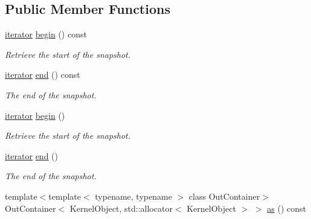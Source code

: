 \subsection*{Public Member Functions}
\begin{DoxyCompactItemize}
\item 
\mbox{\hyperlink{classdistant_1_1kernel__objects_1_1snapshot__iterator}{iterator}} \mbox{\hyperlink{classdistant_1_1kernel__objects_1_1snapshot_a5e9c95fe747a3f4d28dc3d352874770e}{begin}} () const
\begin{DoxyCompactList}\small\item\em Retrieve the start of the snapshot. \end{DoxyCompactList}\item 
\mbox{\hyperlink{classdistant_1_1kernel__objects_1_1snapshot__iterator}{iterator}} \mbox{\hyperlink{classdistant_1_1kernel__objects_1_1snapshot_a4fd564b2c8dda5816fb134688e708924}{end}} () const
\begin{DoxyCompactList}\small\item\em The end of the snapshot. \end{DoxyCompactList}\item 
\mbox{\hyperlink{classdistant_1_1kernel__objects_1_1snapshot__iterator}{iterator}} \mbox{\hyperlink{classdistant_1_1kernel__objects_1_1snapshot_ab23f1b74e2799ece901299d4f69015cc}{begin}} ()
\begin{DoxyCompactList}\small\item\em Retrieve the start of the snapshot. \end{DoxyCompactList}\item 
\mbox{\hyperlink{classdistant_1_1kernel__objects_1_1snapshot__iterator}{iterator}} \mbox{\hyperlink{classdistant_1_1kernel__objects_1_1snapshot_a0ab636ba02b2ec13644a02b00317c4bb}{end}} ()
\begin{DoxyCompactList}\small\item\em The end of the snapshot. \end{DoxyCompactList}\item 
\mbox{\label{classdistant_1_1kernel__objects_1_1snapshot_a4f852a80ef0db09296ca25d4af4d1800}} 
{\footnotesize template$<$template$<$ typename, typename $>$ class Out\+Container$>$ }\\Out\+Container$<$ Kernel\+Object, std\+::allocator$<$ Kernel\+Object $>$ $>$ \mbox{\hyperlink{classdistant_1_1kernel__objects_1_1snapshot_a4f852a80ef0db09296ca25d4af4d1800}{as}} () const

\end{DoxyCompactItemize}

